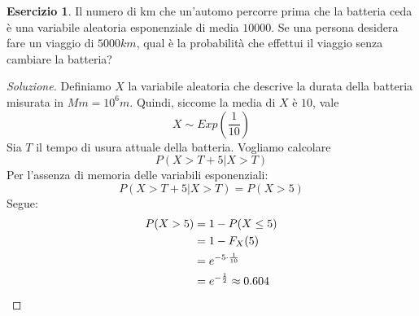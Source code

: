 \documentclass{article}
\theoremstyle{plain}
\theoremstyle{definition}
\newtheorem{esercizio}{Esercizio}[section]
\theoremstyle{remark}
\newenvironment{soluzione}
	{\renewcommand\qedsymbol{$\mathwitch*$}\begin{proof}[Soluzione]}
	{\end{proof}}
\renewcommand{\qedsymbol}{$\mathrightghost$}
\begin{document}
\begin{esercizio}
	Il numero di km che un'automo percorre prima che la batteria ceda è una variabile aleatoria esponenziale di media $10000$. Se una persona desidera fare un viaggio di $5000km$, qual è la probabilità che effettui il viaggio senza cambiare la batteria?
	\begin{soluzione}
		Definiamo $X$ la variabile aleatoria che descrive la durata della batteria misurata in $Mm=10^6m$. Quindi, siccome la media di $X$ è $10$, vale
		\begin{equation*}
			X\sim Exp(\frac{1}{10})
		\end{equation*}
		Sia $T$ il tempo di usura attuale della batteria. Vogliamo calcolare
		\begin{equation*}
			P(X>T+5|X>T)
		\end{equation*}
		Per l'assenza di memoria delle variabili esponenziali:
		\begin{equation*}
			P(X>T+5|X>T)=P(X>5)
		\end{equation*}
		Segue:
		\begin{align*}
			P(X>5)&=1-P(X\leq 5)\\
			&=1-F_X(5)\\
			&=e^{-5\cdot\frac{1}{10}}\\
			&=e^{-\frac{1}{2}}\approx 0.604\qedhere
		\end{align*}
	\end{soluzione}
\end{esercizio}
\end{document}
